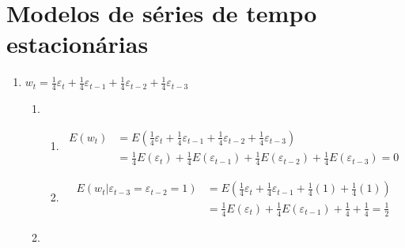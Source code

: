 \chapter{Modelos de séries de tempo estacionárias}

\begin{enumerate}
	\item %
 $w_t=\frac{1}{4}\varepsilon_{t}+\frac{1}{4}\varepsilon_{t-1}+\frac{1}{4}\varepsilon_{t-2}+\frac{1}{4}\varepsilon_{t-3}$
	
		\begin{enumerate}
			\item %
			\begin{enumerate}
				\item \begin{align*}E(w_t)&=E(\frac{1}{4}\varepsilon_{t}+\frac{1}{4}\varepsilon_{t-1}+\frac{1}{4}\varepsilon_{t-2}+\frac{1}{4}\varepsilon_{t-3})\\
				&=\frac{1}{4}E(\varepsilon_{t})+\frac{1}{4}E(\varepsilon_{t-1})+\frac{1}{4}E(\varepsilon_{t-2})+\frac{1}{4}E(\varepsilon_{t-3})=0
				\end{align*}
				
				\item 
				\begin{align*}E(w_t|\varepsilon_{t-3}=\varepsilon_{t-2}=1)&=E(\frac{1}{4}\varepsilon_{t}+\frac{1}{4}\varepsilon_{t-1}+\frac{1}{4}(1)+\frac{1}{4}(1))\\
					&=\frac{1}{4}E(\varepsilon_{t})+\frac{1}{4}E(\varepsilon_{t-1})+\frac{1}{4}+\frac{1}{4}=\frac{1}{2}
				\end{align*}
			\end{enumerate}
			\item %
			

\end{enumerate}
\end{enumerate}
